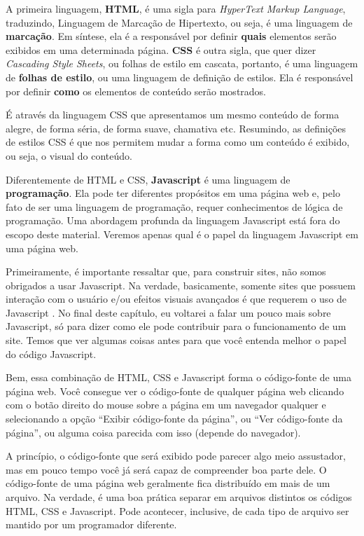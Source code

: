 A primeira linguagem, \textbf{HTML}, é uma sigla para \textit{HyperText Markup Language}, traduzindo, Linguagem de Marcação de Hipertexto, ou seja, é uma linguagem de \textbf{marcação}. Em síntese, ela é a responsável por definir \textbf{quais} elementos serão exibidos em uma determinada página. \textbf{CSS} é outra sigla, que quer dizer \textit{Cascading Style Sheets}, ou folhas de estilo em cascata, portanto, é uma linguagem de \textbf{folhas de estilo}, ou uma linguagem de definição de estilos. Ela é responsável por definir \textbf{como} os elementos de conteúdo serão mostrados.

É através da linguagem CSS que apresentamos um mesmo conteúdo de forma alegre, de forma séria, de forma suave, chamativa etc. Resumindo, as definições de estilos CSS é que nos permitem mudar a forma como um conteúdo é exibido, ou seja, o visual do conteúdo.

Diferentemente de HTML e CSS, \textbf{Javascript} é uma linguagem de \textbf{programação}. Ela pode ter diferentes propósitos em uma página web e, pelo fato de ser uma linguagem de programação, requer conhecimentos de lógica de programação. Uma abordagem profunda da linguagem Javascript está fora do escopo deste material. Veremos apenas qual é o papel da linguagem Javascript em uma página web.

Primeiramente, é importante ressaltar que, para construir sites, não somos obrigados a usar Javascript. Na verdade, basicamente, somente sites que possuem interação com o usuário e/ou efeitos visuais avançados é que requerem o uso de Javascript . No final deste capítulo, eu voltarei a falar um pouco mais sobre Javascript, só para dizer como ele pode contribuir para o funcionamento de um site. Temos que ver algumas coisas antes para que você entenda melhor o papel do código Javascript.

Bem, essa combinação de HTML, CSS e Javascript forma o código-fonte de uma página web. Você consegue ver o código-fonte de qualquer página web clicando com o botão direito do mouse sobre a página em um navegador qualquer e selecionando a opção “Exibir código-fonte da página”, ou “Ver código-fonte da página”, ou alguma coisa parecida com isso (depende do navegador). 

A princípio, o código-fonte que será exibido pode parecer algo meio assustador, mas em pouco tempo você já será capaz de compreender boa parte dele. O código-fonte de uma página web geralmente fica distribuído em mais de um arquivo. Na verdade, é uma boa prática separar em arquivos distintos os códigos HTML, CSS e Javascript. Pode acontecer, inclusive, de cada tipo de arquivo ser mantido por um programador diferente.


